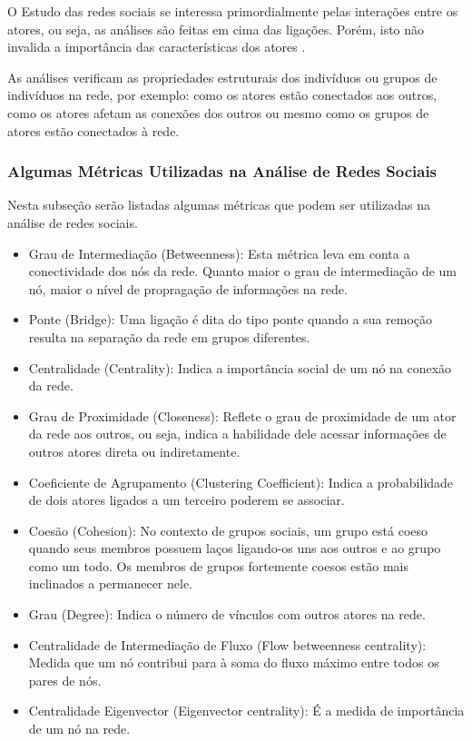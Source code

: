 O Estudo das redes sociais se interessa primordialmente pelas interações entre os atores, ou seja, as análises são feitas em cima das ligações. Porém, isto não invalida a importância das características dos atores \cite{pan2007effective}.

As análises verificam as propriedades estruturais dos indivíduos ou grupos de indivíduos na rede, por exemplo: como os atores estão conectados aos outros, como os atores afetam as conexões dos outros ou mesmo como os grupos de atores estão conectados à rede.

\subsubsection{Algumas Métricas Utilizadas na Análise de Redes Sociais}
Nesta subseção serão listadas algumas métricas que podem ser utilizadas na análise de redes sociais.

\begin{itemize}
 \item Grau de Intermediação (Betweenness): Esta métrica leva em conta a conectividade dos nós da rede. Quanto maior o grau de intermediação de um nó, maior o nível de propragação de informações na rede.
 \item Ponte (Bridge): Uma ligação é dita do tipo ponte quando a sua remoção resulta na separação da rede em grupos diferentes.
 \item Centralidade (Centrality): Indica a importância social de um nó na conexão da rede.
 \item Grau de Proximidade (Closeness): Reflete o grau de proximidade de um ator da rede aos outros, ou seja, indica a habilidade dele acessar informações de outros atores direta ou indiretamente.
 \item Coeficiente de Agrupamento (Clustering Coefficient): Indica a probabilidade de dois atores ligados a um terceiro poderem se associar.
 \item Coesão (Cohesion): No contexto de grupos sociais, um grupo está coeso quando seus membros possuem laços ligando-os uns aos outros e ao grupo como um todo. Os membros de grupos fortemente coesos estão mais inclinados a permanecer nele.
 \item Grau (Degree): Indica o número de vínculos com outros atores na rede.
 \item Centralidade de Intermediação de Fluxo (Flow betweenness centrality): Medida que um nó contribui para à soma do fluxo máximo entre todos os pares de nós.
 \item Centralidade Eigenvector (Eigenvector centrality): É a medida de importância de um nó na rede.
\end{itemize}


